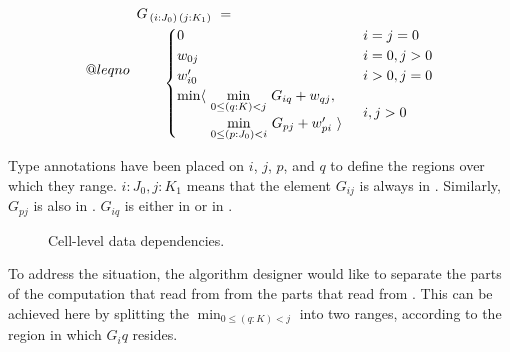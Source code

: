 \makeatletter
\newcommand{\LeftEqNo}{\let\veqno\@@leqno}
\makeatother

\begin{equation}\LeftEqNo
\renewcommand\arraystretch{1.5}
\begin{array}{l@{}l}
	G_{\,(i : J_0)\,(j : K_1)} ~=~  \\
	\qquad
	\begin{cases}
		0                        & i=j=0 \\
		w_{0j}                   & i=0, j>0 \\
		w'_{i0}                  & i>0, j=0 \\
		\begin{array}{@{}l@{~}l}
		  \min\langle & \underset{0\leq (q:K) <j}\min ~ G_{iq} + w_{qj}, \\
		              & \underset{0\leq (p:J_0) <i}\min ~ G_{pj} + w'_{pi}~\rangle
		\end{array}              & i,j>0
	\end{cases}
\end{array}
\end{equation}

\medskip
Type annotations have been placed on $i$, $j$, $p$, and $q$ to define the regions
over which they range. $i:J_0, j:K_1$ means that the element $G_{ij}$
is always in . Similarly, $G_{pj}$ is also in . $G_{iq}$ is either in
 or in .

\begin{figure}
\quad
{}
\qquad
{}
\caption{\label{intro:gap dependency matrix}
  Cell-level data dependencies.}
\end{figure}

To address the situation, the algorithm designer would like to separate the parts
of the computation that read from  from the parts that read from .
This can be achieved here by splitting the $\min_{0\leq(q:K)<j}$ into two
ranges, according to the region in which $G_iq$ resides.

